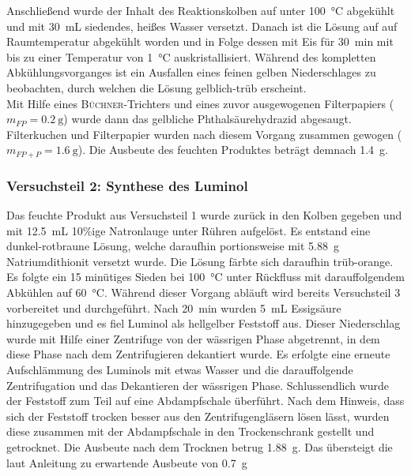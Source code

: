 Anschließend wurde der Inhalt des Reaktionskolben auf unter \SI{100}{\celsius} abgekühlt und mit \SI{30}{\milli \liter} siedendes, heißes Wasser versetzt. Danach ist die Lösung auf auf Raumtemperatur abgekühlt worden und in Folge dessen mit Eis für \SI{30}{\minute} mit bis zu einer Temperatur von \SI{1}{\celsius} auskristallisiert. Während des kompletten Abkühlungsvorganges ist ein Ausfallen eines feinen gelben Niederschlages zu beobachten, durch welchen die Lösung gelblich-trüb erscheint.\\
Mit Hilfe eines \textsc{Büchner}-Trichters und eines zuvor ausgewogenen Filterpapiers ($m_{FP}=\SI{0,2}{\gram}$) wurde dann das gelbliche Phthalsäurehydrazid abgesaugt. Filterkuchen und Filterpapier wurden nach diesem Vorgang zusammen gewogen ($m_{FP+P}=\SI{1,6}{\gram}$).
Die Ausbeute des feuchten Produktes beträgt demnach \SI{1,4}{\gram}.

\subsubsection*{Versuchsteil 2: Synthese des Luminol}
Das feuchte Produkt aus Versuchsteil 1 wurde zurück in den Kolben gegeben und mit \SI{12,5}{\milli \liter} 10\%ige Natronlauge unter Rühren aufgelöst. Es entstand eine dunkel-rotbraune Lösung, welche daraufhin portionsweise mit \SI{5,88}{\gram} Natriumdithionit versetzt wurde. Die Lösung färbte sich daraufhin trüb-orange. Es folgte ein 15 minütiges Sieden bei \SI{100}{\celsius} unter Rückfluss mit darauffolgendem Abkühlen auf \SI{60}{\celsius}. Während dieser Vorgang abläuft wird bereits Versuchsteil 3 vorbereitet und durchgeführt. Nach \SI{20}{\minute} wurden \SI{5}{\milli \liter} Essigsäure hinzugegeben und es fiel Luminol als hellgelber Feststoff aus. Dieser Niederschlag wurde mit Hilfe einer Zentrifuge von der wässrigen Phase abgetrennt, in dem diese Phase nach dem Zentrifugieren dekantiert wurde. Es erfolgte eine erneute Aufschlämmung des Luminols mit etwas Wasser und die darauffolgende Zentrifugation und das Dekantieren der wässrigen Phase. Schlussendlich wurde der Feststoff zum Teil auf eine Abdampfschale überführt. Nach dem Hinweis, dass sich der Feststoff trocken besser aus den Zentrifugengläsern lösen lässt, wurden diese zusammen mit der Abdampfschale in den Trockenschrank gestellt und getrocknet.
Die Ausbeute nach dem Trocknen betrug \SI{1,88}{\gram}. Das übersteigt die laut Anleitung zu erwartende Ausbeute von \SI{0,7}{\gram}

